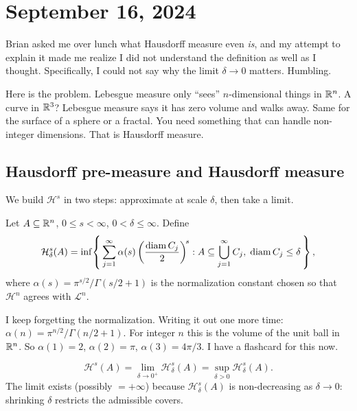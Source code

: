
\section{September 16, 2024}\label{sec:lec6}

Brian asked me over lunch what Hausdorff measure even \emph{is}, and my
attempt to explain it made me realize I did not understand the definition as
well as I thought. Specifically, I could not say why the limit $\delta \to 0$ matters. Humbling.

Here is the problem. Lebesgue measure only ``sees'' $n$-dimensional things in
$\mathbb{R}^n$. A curve in $\mathbb{R}^3$? Lebesgue measure says it has zero volume and walks away. Same for the surface of a
sphere or a fractal. You need something that can handle non-integer
dimensions. That is Hausdorff measure.

\subsection{Hausdorff pre-measure and Hausdorff measure}%
\label{subsec:hausdorff-def}

We build $\mathcal{H}^s$ in two steps: approximate at scale $\delta$,
then take a limit.

\begin{definition}\label{def:hausdorff-premeasure}
Let $A \subseteq \mathbb{R}^n$, $0 \le s < \infty$, $0 < \delta \le \infty$.
Define
\[
  \mathcal{H}^s_\delta(A)
  = \inf\!\left\{\, \sum_{j=1}^\infty \alpha(s)
    \left(\frac{\operatorname{diam} C_j}{2}\right)^{\!s} :
    A \subseteq \bigcup_{j=1}^\infty C_j,\;
    \operatorname{diam} C_j \le \delta \,\right\},
\]
where $\alpha(s) = \pi^{s/2}/\Gamma(s/2+1)$ is the normalization constant
chosen so that $\mathcal{H}^n$ agrees with $\mathcal{L}^n$.
\end{definition}

I keep forgetting the normalization. Writing it out one more time:
$\alpha(n) = \pi^{n/2}/\Gamma(n/2+1)$. For integer $n$ this is the volume
of the unit ball in $\mathbb{R}^n$. So $\alpha(1) = 2$, $\alpha(2) = \pi$,
$\alpha(3) = 4\pi/3$. I have a flashcard for this now.

\begin{definition}%
\label{def:hausdorff-measure}
\[
  \mathcal{H}^s(A)
  = \lim_{\delta \to 0^+} \mathcal{H}^s_\delta(A)
  = \sup_{\delta > 0} \mathcal{H}^s_\delta(A).
\]
The limit exists (possibly $= +\infty$) because $\mathcal{H}^s_\delta(A)$
is non-decreasing as $\delta \to 0$: shrinking $\delta$ restricts the
admissible covers.
\end{definition}

